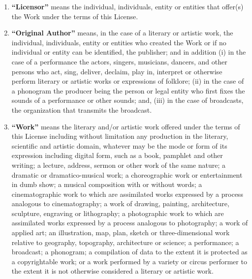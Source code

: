 \begin{enumerate}
\begin{enumerate}
            \item \textbf{``Licensor''} means the individual, individuals,
                entity or entities that offer(s) the Work under the terms of
                this License. 

            \item \textbf{``Original Author''} means, in the case of a literary
                or artistic work, the individual, individuals, entity or
                entities who created the Work or if no individual or entity can
                be identified, the publisher; and in addition (i) in the case
                of a performance the actors, singers, musicians, dancers, and
                other persons who act, sing, deliver, declaim, play in,
                interpret or otherwise perform literary or artistic works or
                expressions of folklore; (ii) in the case of a phonogram the
                producer being the person or legal entity who first fixes the
                sounds of a performance or other sounds; and, (iii) in the case
                of broadcasts, the organization that transmits the broadcast.  

            \item \textbf{``Work''} means the literary and/or artistic work
                offered under the terms of this License including without
                limitation any production in the literary, scientific and
                artistic domain, whatever may be the mode or form of its
                expression including digital form, such as a book, pamphlet and
                other writing; a lecture, address, sermon or other work of the
                same nature; a dramatic or dramatico-musical work; a
                choreographic work or entertainment in dumb show; a musical
                composition with or without words; a cinematographic work to
                which are assimilated works expressed by a process analogous to
                cinematography; a work of drawing, painting, architecture,
                sculpture, engraving or lithography; a photographic work to
                which are assimilated works expressed by a process analogous to
                photography; a work of applied art; an illustration, map, plan,
                sketch or three-dimensional work relative to geography,
                topography, architecture or science; a performance; a
                broadcast; a phonogram; a compilation of data to the extent it
                is protected as a copyrightable work; or a work performed by a
                variety or circus performer to the extent it is not otherwise
                considered a literary or artistic work. 


\end{enumerate}
\end{enumerate}
